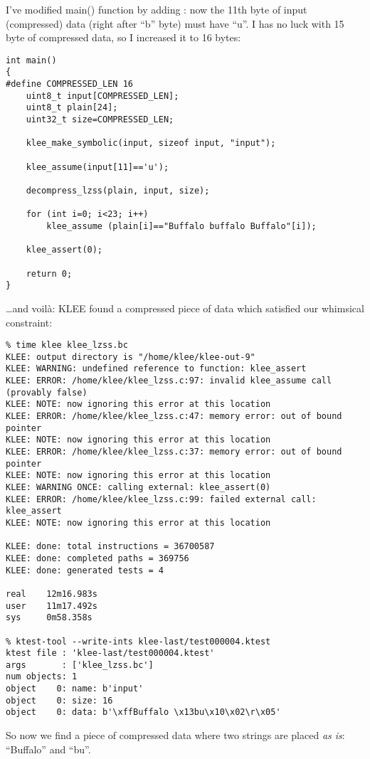 I've modified main() function by adding : now the 11th byte of input (compressed) data (right after ``b'' byte) must have ``u''.
I has no luck with 15 byte of compressed data, so I increased it to 16 bytes:

\begin{lstlisting}
int main()
{
#define COMPRESSED_LEN 16
	uint8_t input[COMPRESSED_LEN];
	uint8_t plain[24];
	uint32_t size=COMPRESSED_LEN;
  
	klee_make_symbolic(input, sizeof input, "input");
	
	klee_assume(input[11]=='u');
	
	decompress_lzss(plain, input, size);

	for (int i=0; i<23; i++)
		klee_assume (plain[i]=="Buffalo buffalo Buffalo"[i]);

	klee_assert(0);
	
	return 0;
}
\end{lstlisting}

\dots and voilà: KLEE found a compressed piece of data which satisfied our whimsical constraint:

\begin{lstlisting}
% time klee klee_lzss.bc
KLEE: output directory is "/home/klee/klee-out-9"
KLEE: WARNING: undefined reference to function: klee_assert
KLEE: ERROR: /home/klee/klee_lzss.c:97: invalid klee_assume call (provably false)
KLEE: NOTE: now ignoring this error at this location
KLEE: ERROR: /home/klee/klee_lzss.c:47: memory error: out of bound pointer
KLEE: NOTE: now ignoring this error at this location
KLEE: ERROR: /home/klee/klee_lzss.c:37: memory error: out of bound pointer
KLEE: NOTE: now ignoring this error at this location
KLEE: WARNING ONCE: calling external: klee_assert(0)
KLEE: ERROR: /home/klee/klee_lzss.c:99: failed external call: klee_assert
KLEE: NOTE: now ignoring this error at this location

KLEE: done: total instructions = 36700587
KLEE: done: completed paths = 369756
KLEE: done: generated tests = 4

real    12m16.983s
user    11m17.492s
sys     0m58.358s

% ktest-tool --write-ints klee-last/test000004.ktest
ktest file : 'klee-last/test000004.ktest'
args       : ['klee_lzss.bc']
num objects: 1
object    0: name: b'input'
object    0: size: 16
object    0: data: b'\xffBuffalo \x13bu\x10\x02\r\x05'
\end{lstlisting}

So now we find a piece of compressed data where two strings are placed \emph{as is}: ``Buffalo'' and ``bu''.

